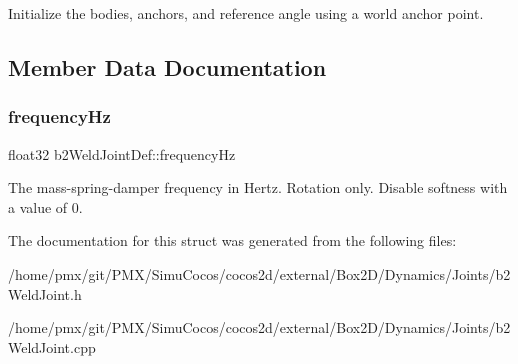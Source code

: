 Initialize the bodies, anchors, and reference angle using a world anchor point. 

\subsection{Member Data Documentation}
\mbox{\label{structb2WeldJointDef_abf42ce852914af845e9203b341f55c87}} 
\subsubsection{\texorpdfstring{frequency\+Hz}{frequencyHz}}
{\footnotesize\ttfamily float32 b2\+Weld\+Joint\+Def\+::frequency\+Hz}

The mass-\/spring-\/damper frequency in Hertz. Rotation only. Disable softness with a value of 0. 

The documentation for this struct was generated from the following files\+:\begin{DoxyCompactItemize}
\item 
/home/pmx/git/\+P\+M\+X/\+Simu\+Cocos/cocos2d/external/\+Box2\+D/\+Dynamics/\+Joints/b2\+Weld\+Joint.\+h\item 
/home/pmx/git/\+P\+M\+X/\+Simu\+Cocos/cocos2d/external/\+Box2\+D/\+Dynamics/\+Joints/b2\+Weld\+Joint.\+cpp\end{DoxyCompactItemize}
